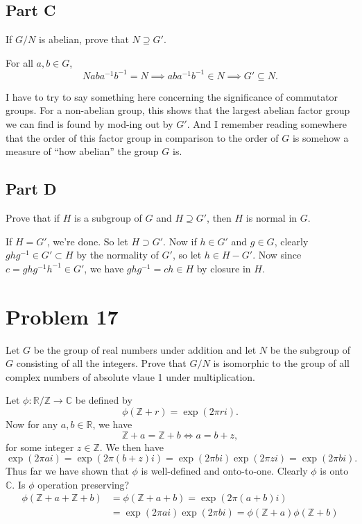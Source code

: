 \documentclass[12pt]{article}
\newcommand{\Z}{\mathbb{Z}}
\newcommand{\R}{\mathbb{R}}
\newcommand{\C}{\mathbb{C}}
\begin{document}
\subsection*{Part C}

If $G/N$ is abelian, prove that $N\supseteq G'$.

For all $a,b\in G$,
\begin{equation*}
Naba^{-1}b^{-1}=N\implies aba^{-1}b^{-1}\in N\implies G'\subseteq N.
\end{equation*}

I have to try to say something here concerning the significance of commutator groups.
For a non-abelian group, this shows that the largest abelian factor group we can find
is found by mod-ing out by $G'$.  And I remember reading somewhere that the order of
this factor group in comparison to the order of $G$ is somehow a measure of ``how abelian''
the group $G$ is.

\subsection*{Part D}

Prove that if $H$ is a subgroup of $G$ and $H\supseteq G'$, then $H$ is normal in $G$.

If $H=G'$, we're done.  So let $H\supset G'$.  Now if $h\in G'$ and $g\in G$,
clearly $ghg^{-1}\in G'\subset H$ by the normality of $G'$, so let $h\in H-G'$.
Now since $c=ghg^{-1}h^{-1}\in G'$, we have $ghg^{-1}=ch\in H$ by closure in $H$.

\section*{Problem 17}

Let $G$ be the group of real numbers under addition and let $N$ be the
subgroup of $G$ consisting of all the integers.  Prove that $G/N$ is
isomorphic to the group of all complex numbers of absolute vlaue 1
under multiplication.

Let $\phi:\R/\Z\to\C$ be defined by
\begin{equation*}
\phi(\Z+r) = \exp(2\pi r i).
\end{equation*}
Now for any $a,b\in\R$, we have
\begin{equation*}
\Z+a=\Z+b \iff a=b+z,
\end{equation*}
for some integer $z\in\Z$.  We then have
\begin{equation*}
\exp(2\pi a i) = \exp(2\pi(b+z) i) = \exp(2\pi b i)\exp(2\pi z i) = \exp(2\pi b i).
\end{equation*}
Thus far we have shown that $\phi$ is well-defined and onto-to-one.
Clearly $\phi$ is onto $\C$.  Is $\phi$ operation preserving?
\begin{align*}
 \phi(\Z+a+\Z+b) &=\phi(\Z+a+b) = \exp(2\pi(a+b)i) \\
&=\exp(2\pi a i)\exp(2\pi b i) = \phi(\Z+a)\phi(\Z+b)
\end{align*}
\end{document}
